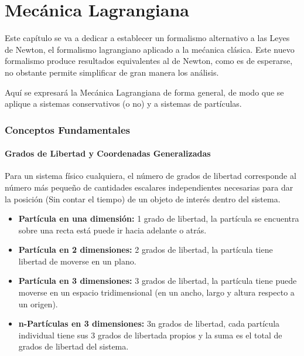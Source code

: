 \documentclass[/home/hernan/Documentos/Apuntes_mecanica_teorica/main.tex]{subfiles}
\begin{document}
    \part{Mecánica Lagrangiana}

    Este capítulo se va a dedicar a establecer un formalismo alternativo a las Leyes de Newton, el formalismo lagrangiano aplicado a la mećanica clásica. Este nuevo formalismo produce resultados equivalentes al de Newton, como es de esperarse, no obstante permite simplificar de gran manera los análisis.

    Aquí se expresará la Mecánica Lagrangiana de forma general, de modo que se aplique a sistemas conservativos (o no) y a sistemas de partículas.

    \section{Conceptos Fundamentales}

    \subsection{Grados de Libertad y Coordenadas Generalizadas}

    \begin{definition}
        Para un sistema físico cualquiera, el número de grados de libertad corresponde al número más pequeño de cantidades escalares independientes necesarias para dar la posición (Sin contar el tiempo) de un objeto de interés dentro del sistema.

        \begin{itemize}
            \item \textbf{Partícula en una dimensión:} 1 grado de libertad, la partícula se encuentra sobre una recta está puede ir hacia adelante o atrás.
            \item \textbf{Partícula en 2 dimensiones:} 2 grados de libertad, la partícula tiene libertad de moverse en un plano.
            \item \textbf{Partícula en 3 dimensiones:} 3 grados de libertad, la partícula tiene puede moverse en un espacio tridimensional (en un ancho, largo y altura respecto a un origen).
            \item \textbf{n-Partículas en 3 dimensiones:} 3n grados de libertad, cada partícula individual tiene sus 3 grados de libertada propios y la suma es el total de grados de libertad del sistema.
        \end{itemize}
        
    \end{definition}
\end{document}
